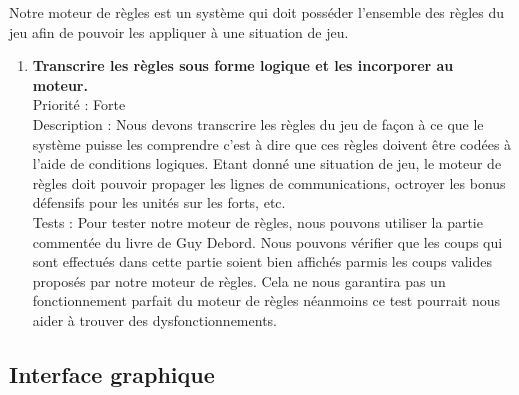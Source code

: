 \documentclass[12pt]{article}
\begin{document}
			Notre moteur de règles est un système qui doit posséder l'ensemble des règles du jeu afin de pouvoir les appliquer à une situation de jeu.

			\begin{enumerate}

				\item \textbf{Transcrire les règles sous forme logique et les incorporer au moteur.} 
				\\[0.7\baselineskip]
				Priorité : Forte 
				\\[0.7\baselineskip]
				Description : Nous devons transcrire les règles du jeu de façon à ce que le système puisse les comprendre c'est à dire que ces 
				règles doivent être codées à l'aide de conditions logiques. Etant donné une situation de jeu, le moteur de règles doit pouvoir 
				propager les lignes de communications, octroyer les bonus défensifs pour les unités sur les forts, etc.
				\\[0.7\baselineskip]
				Tests : Pour tester notre moteur de règles, nous pouvons utiliser la partie commentée du livre de Guy Debord. Nous pouvons 
				vérifier que les coups qui sont effectués dans cette partie soient bien affichés parmis les coups valides proposés par notre 
				moteur de règles. Cela ne nous garantira pas un fonctionnement parfait du moteur de règles néanmoins ce test pourrait nous 
				aider à trouver des dysfonctionnements. 
				\\[0.7\baselineskip]
				
			\end{enumerate}

		\subsection{Interface graphique}
\end{document}

